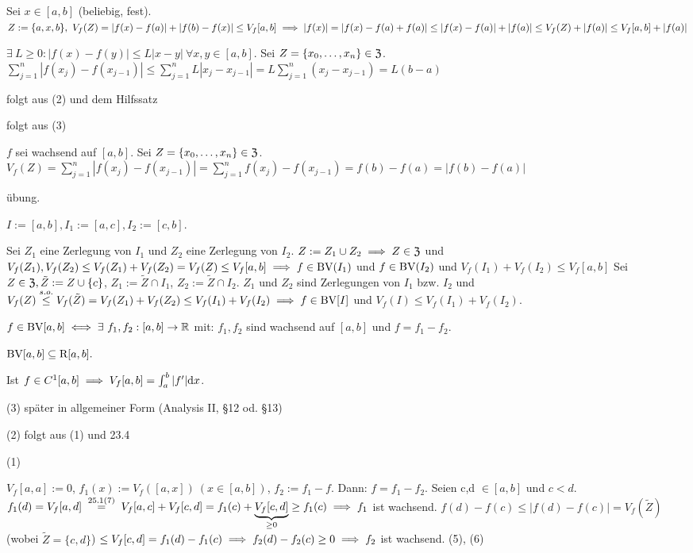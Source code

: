 \documentclass[a4paper,oneside,DIV15,BCOR12mm]{scrbook}
\begin{document}
\begin{beweise}
\item Sei $x\in [a,b]$ (beliebig, fest). $Z:=\{a,x,b\},\ V_f(Z)=|f(x)-f(a)|+|f(b)-f(x)|\le V_f[a,b]\folgt|f(x)|=|f(x)-f(a)+f(a)|\le |f(x)-f(a)|+|f(a)|\le V_f(Z)+|f(a)|\le V_f[a,b]+|f(a)|$
\item $\exists\ L \ge 0:|f(x)-f(y)|\le L|x-y|\ \forall x,y\in[a,b]$. Sei $Z=\{x_0,\ldots,x_n\}\in\mathfrak{Z}$. $\sum^n_{j=1}|f(x_j)-f(x_{j-1})|\le\sum^n_{j=1}L|x_j-x_{j-1}|=L\sum^n_{j=1}(x_j-x_{j-1})=L(b-a)$
\item folgt aus (2) und dem Hilfssatz
\item folgt aus (3)
\item $f$ sei wachsend auf $[a,b]$. Sei $Z=\{x_0,\ldots,x_n\}\in\mathfrak{Z}$. $V_f(Z)=\sum^n_{j=1}|f(x_j)-f(x_{j-1})|=\sum^n_{j=1}f(x_j)-f(x_{j-1})=f(b)-f(a)=|f(b)-f(a)|$
\item übung.
\item $I:=[a,b],I_1:=[a,c],I_2:=[c,b]$.
\begin{description}
\hin Sei $Z_1$ eine Zerlegung von $I_1$ und $Z_2$ eine Zerlegung von $I_2$. $Z:=Z_1 \cup Z_2\implies Z\in\mathfrak{Z}$ und $V_f(Z_1),V_f(Z_2)\le V_f(Z_1)+V_f(Z_2)=V_f(Z)\le V_f[a,b]\implies f\in\text{BV}(I_1)$ und $f\in\text{BV}(I_2)$ und $V_f(I_1)+V_f(I_2)\le V_f[a,b]$
\zurueck Sei $Z \in\mathfrak{Z},\tilde{Z}:=Z\cup\{c\}$, $Z_1:=\tilde{Z}\cap I_1$, $Z_2:=\tilde{Z}\cap I_2$. $Z_1$ und $Z_2$ sind Zerlegungen von $I_1$ bzw. $I_2$ und $V_f(Z)\overset{s.o.}{\le}V_f(\tilde{Z})=V_f(Z_1)+V_f(Z_2)\le V_f(I_1)+V_f(I_2)\implies f\in\text{BV}[I]$ und $V_f(I)\le V_f(I_1)+V_f(I_2)$.
\end{description}
\end{beweise}

\begin{satz}
\begin{liste}
\item $f\in\BV[a,b]\equizu\exists\ f_1,f_2:[a,b]\to\MdR$ mit: $f_1,f_2$ sind wachsend auf $[a,b]$ und $f=f_1-f_2$.
\item $\text{BV}[a,b]\subseteq \text{R}[a,b].$
\item Ist $f\in C^1[a,b]\implies V_f[a,b]=\int_a^b|f'|\text{d}x$.
\end{liste}
\end{satz}

\begin{beweise}
\item[(3)] später in allgemeiner Form (Analysis II, §12 od. §13)
\item[(2)] folgt aus (1) und 23.4
\item[(1)]
\begin{description}
\hin $V_f[a,a]:=0$, $f_1(x):=V_f([a,x])\ (x\in[a,b])$, $f_2:=f_1-f$. Dann: $f=f_1-f_2$. Seien c,d $\in [a,b]$ und $c<d$. $f_1(d)=V_f[a,d]\gleichnach{25.1(7)}V_f[a,c]+V_f[c,d]=f_1(c)+\underbrace{V_f[c,d]}_{\ge 0}\ge f_1(c)\folgt f_1$ ist wachsend. $f(d)-f(c)\le|f(d)-f(c)|=V_f(\tilde{Z})$ (wobei $\tilde{Z}=\{c,d\}$) $\le V_f[c,d]=f_1(d)-f_1(c)\implies f_2(d)-f_2(c)\ge 0 \implies f_2$ ist wachsend.
(5), (6)
\end{description}
\end{beweise}
\end{document}
